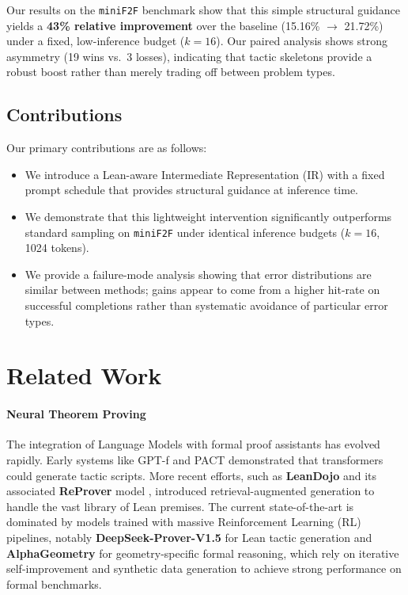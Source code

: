 \documentclass{article}
\begin{document}
Our results on the \texttt{miniF2F} benchmark show that this simple structural guidance yields a \textbf{43\% relative improvement} over the baseline (15.16\% $\to$ 21.72\%) under a fixed, low-inference budget ($k=16$). Our paired analysis shows strong asymmetry (19 wins vs.\ 3 losses), indicating that tactic skeletons provide a robust boost rather than merely trading off between problem types.

\subsection{Contributions}
Our primary contributions are as follows:
\begin{itemize}
    \item We introduce a Lean-aware Intermediate Representation (IR) with a fixed prompt schedule that provides structural guidance at inference time.
    \item We demonstrate that this lightweight intervention significantly outperforms standard sampling on \texttt{miniF2F} under identical inference budgets ($k=16$, 1024 tokens).
    \item We provide a failure-mode analysis showing that error distributions are similar between methods; gains appear to come from a higher hit-rate on successful completions rather than systematic avoidance of particular error types.
\end{itemize}

\section{Related Work}

\paragraph{Neural Theorem Proving}
The integration of Language Models with formal proof assistants has evolved rapidly. Early systems like GPT-f \cite{polu2020generative} and PACT \cite{han2022proof} demonstrated that transformers could generate tactic scripts. More recent efforts, such as \textbf{LeanDojo} and its associated \textbf{ReProver} model \cite{yang2023leandojo}, introduced retrieval-augmented generation to handle the vast library of Lean premises. The current state-of-the-art is dominated by models trained with massive Reinforcement Learning (RL) pipelines, notably \textbf{DeepSeek-Prover-V1.5} \cite{xin2024deepseek} for Lean tactic generation and \textbf{AlphaGeometry} \cite{trinh2024solving} for geometry-specific formal reasoning, which rely on iterative self-improvement and synthetic data generation to achieve strong performance on formal benchmarks.
\end{document}
